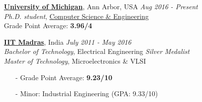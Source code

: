 \documentclass[margin,line,letter]{resume}
\begin{document}
\begin{resume}
    \href{http://www.umich.edu}{\textbf{University of Michigan}}, Ann Arbor, USA \hfill \emph{Aug 2016 - Present} \\ 
    \phantom{x}\hspace{3ex} \emph{Ph.D. student}, \href{http://www.cse.umich.edu}{Computer Science \& Engineering} \\
    \phantom{x}\hspace{3ex} Grade Point Average: \textbf{3.96/4}

    \vspace{-0.2cm}
    \href{http://www.iitm.ac.in}{\textbf{IIT Madras}}, India \hfill \emph{July 2011 - May 2016} \\ 
    \phantom{xx}\hspace{3ex} \emph{Bachelor of Technology}, Electrical Engineering \hfill \textit{Silver Medalist} \\
    \phantom{xx}\hspace{3ex} \emph{Master of Technology}, Microelectronics \& VLSI
    
    \vspace{-0.2cm}
    \begin{itemize}[leftmargin=1.25cm]
        \item[-] Grade Point Average: \textbf{9.23/10}
        \item[-] Minor: Industrial Engineering (GPA: 9.33/10)
    \end{itemize}

    

\end{resume}
\end{document}
